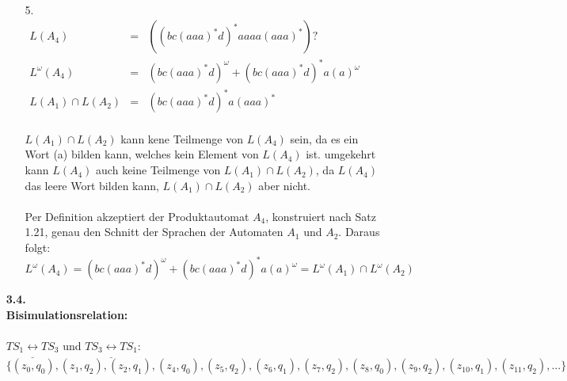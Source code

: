 \documentclass[a4paper,11pt,fleqn]{scrartcl}
\begin{document}
\begin{enumerate}
\begin{enumerate}
\begin{tikzpicture}[>=stealth',shorten >=1pt,auto,node distance=3cm]
					
			\end{tikzpicture} \\
        \item[5.]\quad \\
        	\(
        	\begin{array}{lcl}
            	L(A_4) &=& ((bc(aaa)^*d)^* aaaa(aaa)^*)? \\
                L^\omega(A_4) &=& (bc(aaa)^*d)^\omega + (bc(aaa)^*d)^* a(a)^\omega \\
                L(A_1)\cap L(A_2) &=& (bc(aaa)^*d)^* a(aaa)^*
            \end{array}
            \) \\ \\
            \(L(A_1)\cap L(A_2)\) kann kene Teilmenge von $L(A_4)$ sein, da es ein Wort (a) bilden kann, 
            welches kein Element von $L(A_4)$ ist. umgekehrt kann $L(A_4)$ auch keine Teilmenge von
            \(L(A_1)\cap L(A_2)\), da $L(A_4)$ das leere Wort bilden kann, \(L(A_1)\cap L(A_2)\) aber nicht. 
            \\ \\
            Per Definition akzeptiert der Produktautomat $A_4$, konstruiert nach Satz 1.21, genau den Schnitt
            der Sprachen der Automaten $A_1$ und $A_2$. Daraus folgt: \\
            $L^\omega(A_4) = (bc(aaa)^*d)^\omega + (bc(aaa)^*d)^* a(a)^\omega = L^\omega(A_1)\cap
            L^\omega(A_2)$
        \end{enumerate}
     \item[\textbf{3.4.}]\quad \\
		\textbf{Bisimulationsrelation:} \\ \\
		\(TS_1\underline{\leftrightarrow}TS_3\) und \(TS_3\underline{\leftrightarrow}TS_1:\) \\
    	\(
    		\big\{(z_0,q_0),(z_1,q_2),(z_2,q_1),(z_4,q_0),(z_5,q_2),(z_6,q_1),(z_7,q_2),(z_8,q_0),(z_9,q_2),
    		(z_{10},q_1),(z_{11},q_2),...\big\}
    	\) \\ \\
    	

\end{enumerate}
\end{document}
